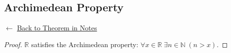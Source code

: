 
\subsection*{Archimedean Property}
\label{prf:archimedean-property}

\begin{remark*}[Return]
$\leftarrow$ \hyperref[thm:archimedean-property]{Back to Theorem in Notes}
\end{remark*}

\begin{proof}
\Claim $\mathbb{R}$ satisfies the Archimedean property: $\forall x \in \mathbb{R}\; \exists n \in \mathbb{N}\; (n > x)$.

\end{proof}

\begin{remark*}
\end{remark*}

\begin{remark*}[Dependencies]
\end{remark*}

